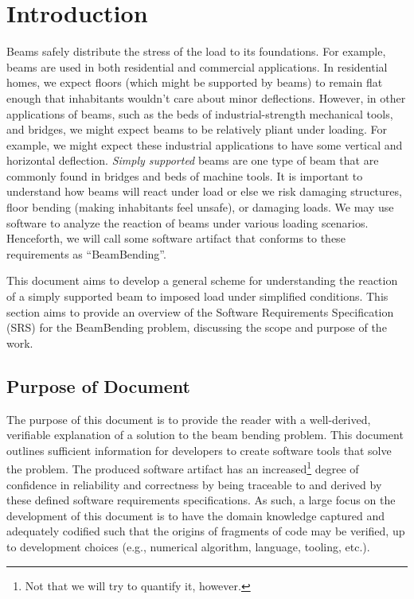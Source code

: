 \documentclass[12pt]{article}
\begin{document}
\section{Introduction}

Beams safely distribute the stress of the load to its foundations. For example,
beams are used in both residential and commercial applications. In residential
homes, we expect floors (which might be supported by beams) to remain flat
enough that inhabitants wouldn't care about minor deflections. However, in other
applications of beams, such as the beds of industrial-strength mechanical tools,
and bridges, we might expect beams to be relatively pliant under loading. For
example, we might expect these industrial applications to have some vertical and
horizontal deflection. \textit{Simply supported} beams are one type of beam that
are commonly found in bridges and beds of machine tools. It is important to
understand how beams will react under load or else we risk damaging structures,
floor bending (making inhabitants feel unsafe), or damaging loads. We may use
software to analyze the reaction of beams under various loading scenarios.
Henceforth, we will call some software artifact that conforms to these
requirements as ``BeamBending''.

This document aims to develop a general scheme for understanding the reaction of
a simply supported beam to imposed load under simplified conditions. This
section aims to provide an overview of the Software Requirements Specification
(SRS) for the BeamBending problem, discussing the scope and purpose of the work.

\subsection{Purpose of Document}

The purpose of this document is to provide the reader with a well-derived,
verifiable explanation of a solution to the beam bending problem. This document
outlines sufficient information for developers to create software tools that
solve the \progname{} problem. The produced software artifact has an
increased\footnote{Not that we will try to quantify it, however.} degree of
confidence in reliability and correctness by being traceable to and derived by
these defined software requirements specifications. As such, a large focus on
the development of this document is to have the domain knowledge captured and
adequately codified such that the origins of fragments of code may be verified,
up to development choices (e.g., numerical algorithm, language, tooling, etc.).
\end{document}
